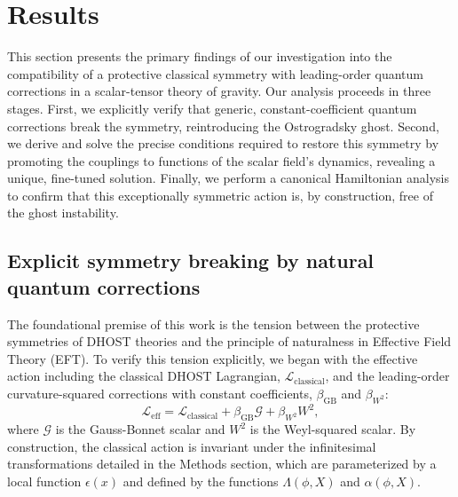 \documentclass[twocolumn]{aastex631}
\begin{document}
\section{Results}
\label{sec:results}
This section presents the primary findings of our investigation into the compatibility of a protective classical symmetry with leading-order quantum corrections in a scalar-tensor theory of gravity. Our analysis proceeds in three stages. First, we explicitly verify that generic, constant-coefficient quantum corrections break the symmetry, reintroducing the Ostrogradsky ghost. Second, we derive and solve the precise conditions required to restore this symmetry by promoting the couplings to functions of the scalar field's dynamics, revealing a unique, fine-tuned solution. Finally, we perform a canonical Hamiltonian analysis to confirm that this exceptionally symmetric action is, by construction, free of the ghost instability.

\subsection{Explicit symmetry breaking by natural quantum corrections}
The foundational premise of this work is the tension between the protective symmetries of DHOST theories and the principle of naturalness in Effective Field Theory (EFT). To verify this tension explicitly, we began with the effective action including the classical DHOST Lagrangian, $\mathcal{L}_{\text{classical}}$, and the leading-order curvature-squared corrections with constant coefficients, $\beta_{\text{GB}}$ and $\beta_{W^2}$:
\begin{equation}
\mathcal{L}_{\text{eff}} = \mathcal{L}_{\text{classical}} + \beta_{\text{GB}} \mathcal{G} + \beta_{W^2} W^2,
\end{equation}
where $\mathcal{G}$ is the Gauss-Bonnet scalar and $W^2$ is the Weyl-squared scalar. By construction, the classical action is invariant under the infinitesimal transformations detailed in the Methods section, which are parameterized by a local function $\epsilon(x)$ and defined by the functions $\Lambda(\phi, X)$ and $\alpha(\phi, X)$.
\end{document}
